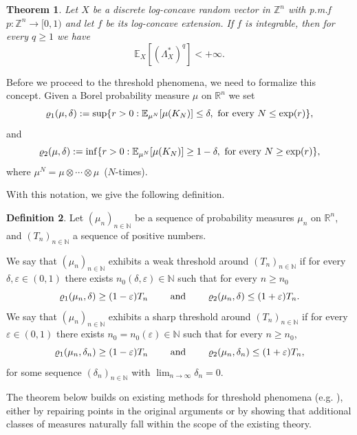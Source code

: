 \documentclass[11pt,a4paper]{article} %
\newtheorem{theorem}{Theorem}[section]
\theoremstyle{definition}
\newtheorem{definition}[theorem]{Definition}
\theoremstyle{remark}
\newcommand{\E}{\mathbb{E}}
\newcommand{\1}{\mathds{1}}
\newcommand{\ls}{\le}
\newcommand{\gr}{\ge}
\begin{document}
\begin{theorem}\label{thm:lambda-star-moments} Let $X$ be a discrete log-concave random vector in $\mathbb{Z}^n$ with p.m.f $p:\mathbb{Z}^n \to [0,1) $ and let $f$ be its log-concave extension. If $f$ is integrable, then for every $q \geq 1$ we have $$\mathbb{E}_X[(\Lambda_{X}^{\ast})^q] <+\infty.$$
\end{theorem}


Before we proceed to the threshold phenomena, we need to formalize this concept. Given a Borel probability measure $\mu$ on $\mathbb{R}^n$ we set 
\[
\varrho_1(\mu,\delta):= \sup\{r>0: \E_{\mu^N}[\mu(K_N)]\ls \delta, \hbox{ for every } N\ls \exp(r)\},
\]
and
\[
\varrho_2(\mu,\delta):= \inf\{r>0: \E_{\mu^N}[\mu(K_N)]\gr 1-\delta, \hbox{ for every } N\gr \exp(r)\},
\]
where $\mu^N=\mu \otimes\cdots\otimes\mu \, $ ($N$-times).

With this notation, we give the following definition.
\begin{definition}\label{def:sharp-threshold}
Let $(\mu_n)_{n\in\mathbb{N}}$ be a sequence of probability measures $\mu_n$ on $\mathbb{R}^n$, and $(T_n)_{n \in \mathbb{N}}$ a sequence of positive numbers. 

 We say that $(\mu_n)_{n\in\mathbb{N}}$ exhibits a weak threshold around $(T_n)_{n \in \mathbb{N}}$ if for every $\delta, \varepsilon \in (0,1)$ there exists $n_0(\delta,\varepsilon) \in \mathbb{N}$ such that for every $n \geq n_0$ \[
\varrho_1(\mu_n,\delta)\gr(1-\varepsilon)T_n \qquad\hbox{ and }\qquad \varrho_2(\mu_n,\delta)\ls(1+\varepsilon)T_n.
\]
We say that $(\mu_n)_{n\in\mathbb{N}}$ exhibits a sharp threshold around $(T_n)_{n \in \mathbb{N}}$ if for every $\varepsilon\in(0,1)$ there exists  $n_0=n_0(\varepsilon)\in\mathbb{N}$ such that for every $n\gr n_0$,
\[
\varrho_1(\mu_n,\delta_n)\gr(1-\varepsilon)T_n \qquad\hbox{ and }\qquad \varrho_2(\mu_n,\delta_n)\ls(1+\varepsilon)T_n,
\]
for some sequence $(\delta_n)_{n \in \mathbb{N}}$ with $\lim_{n\to\infty}\delta_n=0$.
\end{definition}

The theorem below builds on existing methods for threshold phenomena (e.g. \cite{DFM,GaGia,Paf}), either by repairing points in the original arguments or by showing that additional classes of measures naturally fall within the scope of the existing theory.
\end{document}
